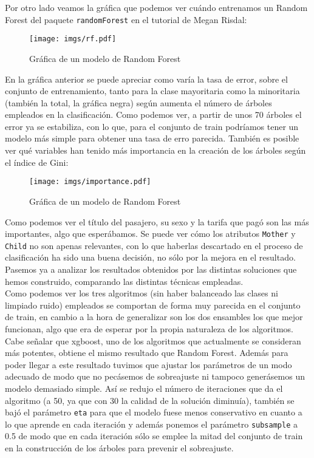 \documentclass[10pt,a4paper]{article}
\newcommand{\code}[1]{\textcolor{rblue}{\texttt{#1}}} %
\begin{document}
Por otro lado veamos la gráfica que podemos ver cuándo entrenamos un Random Forest del paquete \code{randomForest} en el tutorial de Megan Risdal: 

\begin{figure}[H]
  \centering
  \texttt{[image: imgs/rf.pdf]}
  \caption{Gráfica de un modelo de Random Forest}
\end{figure}

En la gráfica anterior se puede apreciar como varía la tasa de error, sobre el conjunto de entrenamiento, tanto para la clase mayoritaria como la minoritaria (también la total, la gráfica negra) según aumenta el número de árboles empleados en la clasificación. Como podemos ver, a partir de unos 70 árboles el error ya se estabiliza, con lo que, para el conjunto de train podríamos tener un modelo más simple para obtener una tasa de erro parecida. También es posible ver qué variables han tenido más importancia en la creación de los árboles según el índice de Gini:

\begin{figure}[H]
  \centering
  \texttt{[image: imgs/importance.pdf]}
  \caption{Gráfica de un modelo de Random Forest}
\end{figure}

Como podemos ver el título del pasajero, su sexo y la tarifa que pagó son las más importantes, algo que esperábamos. Se puede ver cómo los atributos \code{Mother} y \code{Child} no son apenas relevantes, con lo que haberlas descartado en el proceso de clasificación ha sido una buena decisión, no sólo por la mejora en el resultado. Pasemos ya a analizar los resultados obtenidos por las distintas soluciones que hemos construido, comparando las distintas técnicas empleadas.\\

Como podemos ver los tres algoritmos (sin haber balanceado las clases ni limpiado ruido) empleados se comportan de forma muy parecida en el conjunto de train, en cambio a la hora de generalizar son los dos ensambles los que mejor funcionan, algo que era de esperar por la propia naturaleza de los algoritmos. Cabe señalar que xgboost, uno de los algoritmos que actualmente se consideran más potentes, obtiene el mismo resultado que Random Forest. Además para poder llegar a este resultado tuvimos que ajustar los parámetros de un modo adecuado de modo que no pecásemos de sobreajuste ni tampoco generásemos un modelo demasiado simple. Así se redujo el número de iteraciones que da el algoritmo (a 50, ya que con 30 la calidad de la solución diminuía), también se bajó el parámetro \code{eta} para que el modelo fuese menos conservativo en cuanto a lo que aprende en cada iteración y además ponemos el parámetro \code{subsample} a 0.5 de modo que en cada iteración sólo se emplee la mitad del conjunto de train en la construcción de los árboles para prevenir el sobreajuste.\\
\end{document}

